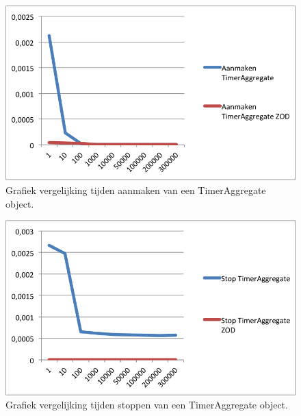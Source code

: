 \begin{figure}[!h]
  \centering
  \includegraphics[scale=1.0]{Afbeeldingen/Evaluatie/AanmakenTimerAggregate}
  \caption{Grafiek vergelijking tijden aanmaken van een TimerAggregate object.}
  \label{fig:GraphTimerAggregate}
\end{figure}

\begin{figure}[!h]
  \centering
  \includegraphics[scale=1.0]{Afbeeldingen/Evaluatie/StopTimerAggregate}
  \caption{Grafiek vergelijking tijden stoppen van een TimerAggregate object.}
  \label{fig:GraphTimerAggregateStop}
\end{figure}



